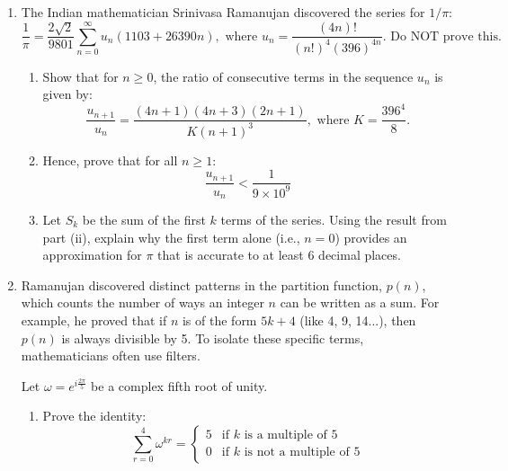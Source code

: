 \begin{problem}
\begin{enumerate}
    \item[\textbf{(a)}] {\ramanujanfont The Indian mathematician Srinivasa Ramanujan} discovered the series for $1/\pi$:
    \[
    \frac{1}{\pi} = \frac{2\sqrt{2}}{9801} \sum_{n=0}^{\infty} u_n(1103 + 26390n), \text{ where } u_n = \frac{(4n)!}{(n!)^4(396)^{4n}}. \text{ Do NOT prove this.}
    \]

    \begin{enumerate}
        \item[(i)] Show that for $n \ge 0$, the ratio of consecutive terms in the sequence $u_n$ is given by:
        \[
        \frac{u_{n+1}}{u_n} = \frac{(4n + 1)(4n + 3)(2n + 1)}{K(n + 1)^3}, \text{ where } K = \frac{396^4}{8}.
        \]

        \item[(ii)] Hence, prove that for all $n \ge 1$:
        \[
        \frac{u_{n+1}}{u_n} < \frac{1}{9 \times 10^9}
        \]

        \item[(iii)] Let $S_k$ be the sum of the first $k$ terms of the series. Using the result from part (ii), explain why the first term alone (i.e., $n = 0$) provides an approximation for $\pi$ that is accurate to at least 6 decimal places.
    \end{enumerate}

    \smallskip
    \item[\textbf{(b)}] {\ramanujanfont Ramanujan discovered distinct patterns in the partition function, $p(n)$, which counts the number of ways an integer $n$ can be written as a sum. For example, he proved that if $n$ is of the form $5k + 4$ (like 4, 9, 14...), then $p(n)$ is always divisible by 5. To isolate these specific terms, mathematicians often use filters.}

    \noindent Let $\omega = e^{i\frac{2\pi}{5}}$ be a complex fifth root of unity.

    \begin{enumerate}
        \item[(i)] Prove the identity:
        \[
        \sum_{r=0}^{4} \omega^{kr} = 
        \begin{cases} 
        5 & \text{if } k \text{ is a multiple of } 5 \\ 
        0 & \text{if } k \text{ is not a multiple of } 5 
        \end{cases}
        \]


\end{enumerate}
\end{enumerate}
\end{problem}
